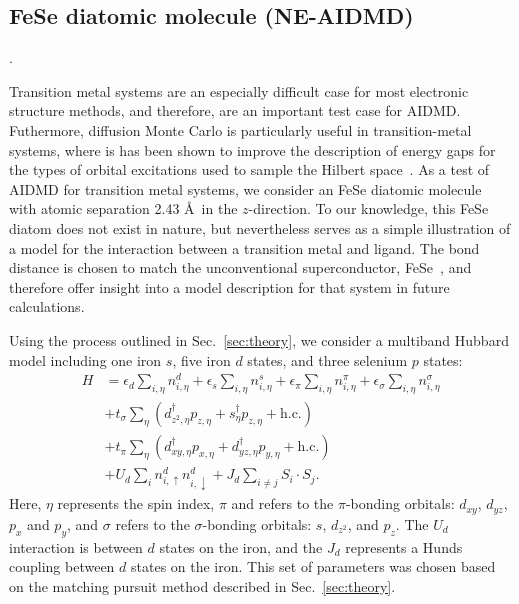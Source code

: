 \subsection{FeSe diatomic molecule (NE-AIDMD)}
.


Transition metal systems are an especially difficult case for most electronic structure methods, and therefore, are an important test case for AIDMD.
Futhermore, diffusion Monte Carlo is particularly useful in transition-metal systems, where is has been shown to improve the description of energy gaps for the types of orbital excitations used to sample the Hilbert space~\cite{lucas}.
As a test of AIDMD for transition metal systems, we consider an FeSe diatomic molecule with atomic separation 2.43 \AA~in the $z$-direction.
To our knowledge, this FeSe diatom does not exist in nature, but nevertheless serves as a simple illustration of a model for the interaction between a transition metal and ligand.
The bond distance is chosen to match the unconventional superconductor, FeSe~\cite{fese}, and therefore offer insight into a model description for that system in future calculations.

Using the process outlined in Sec.~\ref{sec:theory}, we consider a multiband Hubbard model including one iron $s$, five iron $d$ states, and three selenium $p$ states:
\begin{align*}
  H 
  &=
  \epsilon_d \sum_{i,\eta} n^{d}_{i,\eta} 
  +
  \epsilon_s \sum_{i,\eta} n^{s}_{i,\eta} 
  +
  \epsilon_\pi \sum_{i,\eta} n^{\pi}_{i,\eta} 
  +
  \epsilon_\sigma \sum_{i,\eta} n^{\sigma}_{i,\eta} 
  \\
  &+ 
  t_{\sigma} \sum_{\eta} \left( d_{z^2,\eta}^{\dagger} p_{z,\eta} + s_{\eta}^{\dagger}  p_{z,\eta} + \text{h.c.} \right)
  \\
  &+ 
  t_{\pi} \sum_{\eta} \left( d_{xy,\eta}^{\dagger} p_{x,\eta} + d_{yz,\eta}^{\dagger}  p_{y,\eta} + \text{h.c.} \right)
  \\
  &+
  U_d \sum_{i} n^{d}_{i,\uparrow} n^{d}_{i,\downarrow} 
  +
  J_d \sum_{i\ne j} S_i \cdot S_j.
\end{align*}
Here, $\eta$ represents the spin index, $\pi$ and refers to the $\pi$-bonding orbitals: $d_{xy}$, $d_{yz}$, $p_x$ and $p_y$, and $\sigma$ refers to the $\sigma$-bonding orbitals: $s$, $d_{z^2}$, and $p_z$. 
The $U_d$ interaction is between $d$ states on the iron, and the $J_d$ represents a Hunds coupling between $d$ states on the iron.
This set of parameters was chosen based on the matching pursuit method described in Sec.~\ref{sec:theory}.

